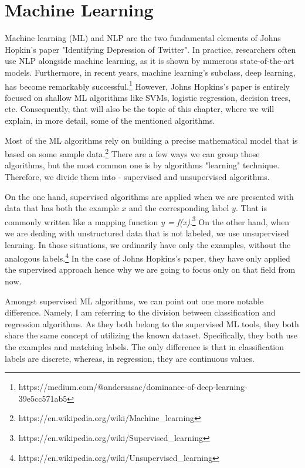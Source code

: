 \documentclass[times, utf8, seminar]{fer}
\begin{document}
\chapter{Machine Learning}

Machine learning (ML) and NLP are the two fundamental elements of Johns Hopkin's paper "Identifying Depression of Twitter". In practice, researchers often use NLP alongside machine learning, as it is shown by numerous state-of-the-art models. Furthermore, in recent years, machine learning's subclass, deep learning, has become remarkably successful.\footnote{https://medium.com/@andersasac/dominance-of-deep-learning-39e5cc571ab5} However, Johns Hopkins's paper is entirely focused on shallow ML algorithms like SVMs, logistic regression, decision trees, etc. Consequently, that will also be the topic of this chapter, where we will explain, in more detail, some of the mentioned algorithms.

Most of the ML algorithms rely on building a precise mathematical model that is based on some sample data.\footnote{https://en.wikipedia.org/wiki/Machine\_learning} There are a few ways we can group those algorithms, but the most common one is by algorithms "learning" technique. Therefore, we divide them into - supervised and unsupervised algorithms.

On the one hand, supervised algorithms are applied when we are presented with data that has both the example $x$ and the corresponding label $y$. That is commonly written like a mapping function \textit{y = f(x)}.\footnote{https://en.wikipedia.org/wiki/Supervised\_learning} On the other hand, when we are dealing with unstructured data that is not labeled, we use unsupervised learning. In those situations, we ordinarily have only the examples, without the analogous labels.\footnote{https://en.wikipedia.org/wiki/Unsupervised\_learning} In the case of Johns Hopkins's paper, they have only applied the supervised approach hence why we are going to focus only on that field from now.

\newpage

Amongst supervised ML algorithms, we can point out one more notable difference. Namely, I am referring to the division between classification and regression algorithms. As they both belong to the supervised ML tools, they both share the same concept of utilizing the known dataset. Specifically, they both use the examples and matching labels. The only difference is that in classification labels are discrete, whereas, in regression, they are continuous values.  
\end{document}
